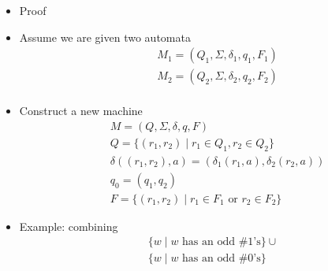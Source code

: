 \begin{frame}[allowframebreaks]
\begin{itemize}
\item Proof
\item [] Assume we are given two automata
  \begin{eqnarray*}
&& M_1 =(Q_1, \Sigma, \delta_1, q_1, F_1)\\
&& M_2 =(Q_2, \Sigma, \delta_2, q_2, F_2)\\
  \end{eqnarray*}
\item Construct a new machine
  \begin{eqnarray*}
&& M =(Q, \Sigma, \delta, q, F)\\
&& Q=\{(r_1,r_2)\mid r_1 \in Q_1, r_2 \in Q_2\}\\
&& \delta((r_1,r_2),a)=(\delta_1(r_1,a), \delta_2(r_2,a))\\
&& q_0 = (q_1,q_2)\\
&& F=\{(r_1, r_2) \mid r_1 \in F_1 
\text{ or } r_2 \in F_2\}
  \end{eqnarray*}
\item Example: combining
  \begin{equation*}
    \begin{split}
      & \{ w \mid w \text{ has an odd \# 1's} \} \cup \\
      & \{ w \mid w \text{ has an odd \# 0's} \}
\end{split}
\end{equation*}
\begin{center}


\end{center}
\end{itemize}
\end{frame}
